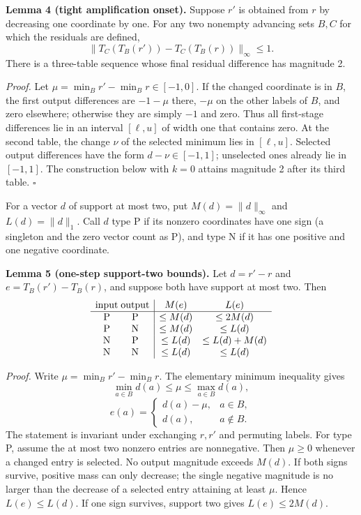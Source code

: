 \textbf{Lemma 4 (tight amplification onset).} Suppose $r'$ is obtained from $r$ by decreasing one coordinate by one. For any two nonempty advancing sets $B,C$ for which the residuals are defined,
\[
 \lVert T_C(T_B(r'))-T_C(T_B(r))\rVert_\infty\leq1.
\]
There is a three-table sequence whose final residual difference has magnitude 2.

\textit{Proof.} Let $\mu=\min_B r'-\min_B r\in[-1,0]$. If the changed coordinate is in $B$, the first output differences are $-1-\mu$ there, $-\mu$ on the other labels of $B$, and zero elsewhere; otherwise they are simply $-1$ and zero. Thus all first-stage differences lie in an interval $[\ell,u]$ of width one that contains zero. At the second table, the change $\nu$ of the selected minimum lies in $[\ell,u]$. Selected output differences have the form $d-\nu\in[-1,1]$; unselected ones already lie in $[-1,1]$. The construction below with $k=0$ attains magnitude 2 after its third table. $\square$

For a vector $d$ of support at most two, put $M(d)=\lVert d\rVert_\infty$ and $L(d)=\lVert d\rVert_1$. Call $d$ type P if its nonzero coordinates have one sign (a singleton and the zero vector count as P), and type N if it has one positive and one negative coordinate.

\textbf{Lemma 5 (one-step support-two bounds).} Let $d=r'-r$ and $e=T_B(r')-T_B(r)$, and suppose both have support at most two. Then
\[
\begin{array}{c@{\;}c|cc}
\text{input}&\text{output}&M(e)&L(e)\\ \hline
\mathrm P&\mathrm P&\leq M(d)&\leq2M(d)\\
\mathrm P&\mathrm N&\leq M(d)&\leq L(d)\\
\mathrm N&\mathrm P&\leq L(d)&\leq L(d)+M(d)\\
\mathrm N&\mathrm N&\leq L(d)&\leq L(d)
\end{array}
\]

\textit{Proof.} Write $\mu=\min_B r'-\min_B r$. The elementary minimum inequality gives
\[
 \min_{a\in B}d(a)\leq\mu\leq\max_{a\in B}d(a),
\]
\[
 e(a)=\begin{cases}d(a)-\mu,&a\in B,\\ d(a),&a\notin B.\end{cases}
\]
The statement is invariant under exchanging $r,r'$ and permuting labels. For type P, assume the at most two nonzero entries are nonnegative. Then $\mu\geq0$ whenever a changed entry is selected. No output magnitude exceeds $M(d)$. If both signs survive, positive mass can only decrease; the single negative magnitude is no larger than the decrease of a selected entry attaining at least $\mu$. Hence $L(e)\leq L(d)$. If one sign survives, support two gives $L(e)\leq2M(d)$.

